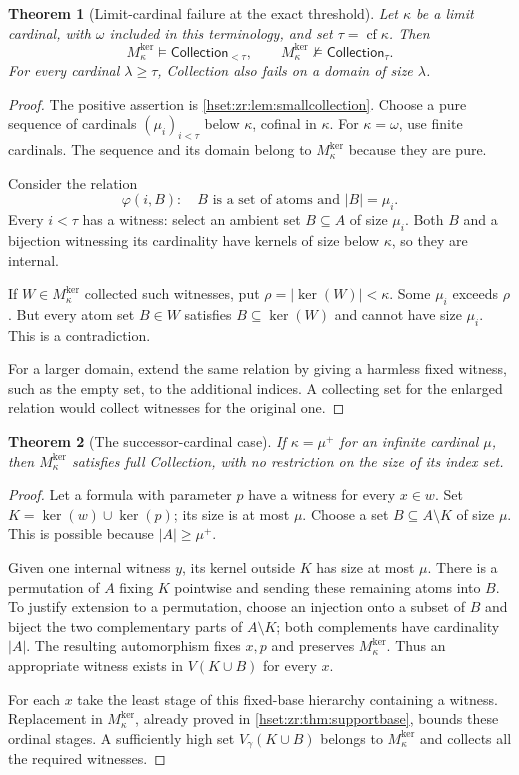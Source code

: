 \documentclass[11pt,letterpaper]{article}
\newtheorem{theorem}{Theorem}[section]
\theoremstyle{definition}
\theoremstyle{remark}
\newcommand{\cf}{\operatorname{cf}}
\newcommand{\CollS}{\mathsf{Collection}}
\newcommand{\kerat}{\operatorname{ker}}
\newcommand{\Mker}{M^{\mathrm{ker}}}
\begin{document}
\begin{theorem}[Limit-cardinal failure at the exact threshold]
\label{hset:zr:thm:limitspectrum}
Let $\kappa$ be a limit cardinal, with $\omega$ included in this terminology, and set $\tau=\cf\kappa$. Then
\[
\Mker_\kappa\models\CollS_{<\tau},
\qquad
\Mker_\kappa\not\models\CollS_{\tau}.
\]
For every cardinal $\lambda\geq\tau$, Collection also fails on a domain of size $\lambda$.
\end{theorem}
\begin{proof}
The positive assertion is \cref{hset:zr:lem:smallcollection}. Choose a pure sequence of cardinals $(\mu_i)_{i<\tau}$ below $\kappa$, cofinal in $\kappa$. For $\kappa=\omega$, use finite cardinals. The sequence and its domain belong to $\Mker_\kappa$ because they are pure.

Consider the relation
\[
\varphi(i,B):\quad B\text{ is a set of atoms and }|B|=\mu_i.
\]
Every $i<\tau$ has a witness: select an ambient set $B\subseteq A$ of size $\mu_i$. Both $B$ and a bijection witnessing its cardinality have kernels of size below $\kappa$, so they are internal.

If $W\in \Mker_\kappa$ collected such witnesses, put $\rho=|\kerat(W)|<\kappa$. Some $\mu_i$ exceeds $\rho$. But every atom set $B\in W$ satisfies $B\subseteq\kerat(W)$ and cannot have size $\mu_i$. This is a contradiction.

For a larger domain, extend the same relation by giving a harmless fixed witness, such as the empty set, to the additional indices. A collecting set for the enlarged relation would collect witnesses for the original one.
\end{proof}

\begin{theorem}[The successor-cardinal case]
\label{hset:zr:thm:successorspectrum}
If $\kappa=\mu^+$ for an infinite cardinal $\mu$, then $\Mker_\kappa$ satisfies full Collection, with no restriction on the size of its index set.
\end{theorem}
\begin{proof}
Let a formula with parameter $p$ have a witness for every $x\in w$. Set $K=\kerat(w)\cup\kerat(p)$; its size is at most $\mu$. Choose a set $B\subseteq A\setminus K$ of size $\mu$. This is possible because $|A|\geq\mu^+$.

Given one internal witness $y$, its kernel outside $K$ has size at most $\mu$. There is a permutation of $A$ fixing $K$ pointwise and sending these remaining atoms into $B$. To justify extension to a permutation, choose an injection onto a subset of $B$ and biject the two complementary parts of $A\setminus K$; both complements have cardinality $|A|$. The resulting automorphism fixes $x,p$ and preserves $\Mker_\kappa$. Thus an appropriate witness exists in $V(K\cup B)$ for every $x$.

For each $x$ take the least stage of this fixed-base hierarchy containing a witness. Replacement in $\Mker_\kappa$, already proved in \cref{hset:zr:thm:supportbase}, bounds these ordinal stages. A sufficiently high set $V_\gamma(K\cup B)$ belongs to $\Mker_\kappa$ and collects all the required witnesses.
\end{proof}
\end{document}
